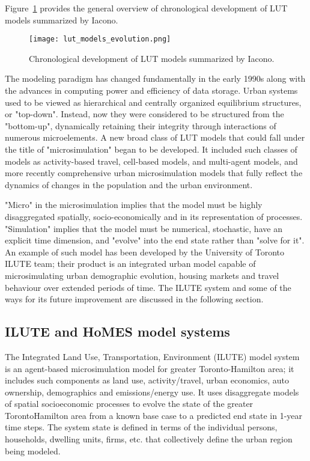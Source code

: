 Figure~\ref{fig:lut_model_evolution} provides the general overview of chronological development of LUT models summarized by Iacono\cite{Iacono2008}.

\begin{figure}[hbt!]
    \centering
    \texttt{[image: lut\_models\_evolution.png]}
    \caption{Chronological development of LUT models summarized by Iacono\cite{Iacono2008}.}
    \label{fig:lut_model_evolution}
\end{figure}

The modeling paradigm has changed fundamentally in the early 1990s along with the advances in computing power and efficiency of data storage.
Urban systems used to be viewed as hierarchical and centrally organized equilibrium structures, or "top-down".
Instead, now they were considered to be structured from the "bottom-up", dynamically retaining their integrity through interactions of numerous microelements\cite{Batty2008}.
A new broad class of LUT models that could fall under the title of "microsimulation" began to be developed.
It included such classes of models as activity-based travel, cell-based models, and multi-agent models, and more recently comprehensive urban microsimulation models that fully reflect the dynamics of changes in the population and the urban environment\cite{Iacono2008}.

"Micro" in the microsimulation implies that the model must be highly disaggregated spatially, socio-economically and in its representation of processes.
"Simulation" implies that the model must be numerical, stochastic, have an explicit time dimension, and "evolve" into the end state rather than "solve for it"\cite{Miller2018c}.
An example of such model has been developed by the University of Toronto ILUTE team;
their product is an integrated urban model capable of microsimulating urban demographic evolution, housing markets and travel behaviour over extended periods of time\cite{Miller2018a}.
The ILUTE system and some of the ways for its future improvement are discussed in the following section.

\subsection{ILUTE and HoMES model systems} \label{subsec:ilute}

The Integrated Land Use, Transportation, Environment (ILUTE) model system is an agent-based microsimulation model for greater Toronto-Hamilton area;
it includes such components as land use, activity/travel, urban economics, auto ownership, demographics and emissions/energy use.
It uses disaggregate models of spatial socioeconomic processes to evolve the state of the greater Toronto\textendash Hamilton area from a known base case to a predicted end state in 1-year time steps.
The system state is defined in terms of the individual persons, households, dwelling units, firms, etc.
that collectively define the urban region being modeled\cite{Miller2011}.

